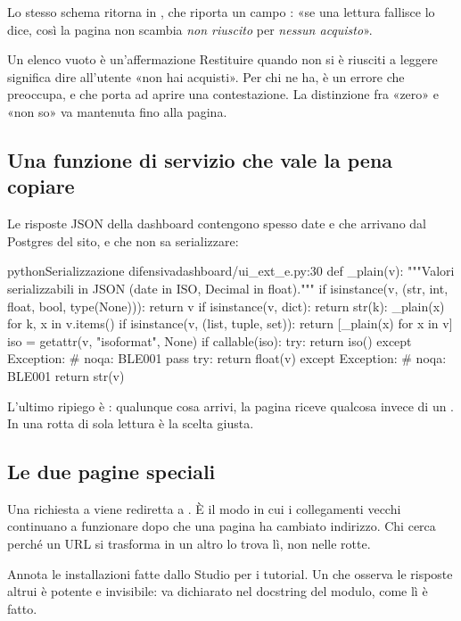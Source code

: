 Lo stesso schema ritorna in , che riporta un campo
: «se una lettura fallisce lo dice, così la pagina non scambia
\emph{non riuscito} per \emph{nessun acquisto}».

\begin{attenzione}{Un elenco vuoto è un'affermazione}
Restituire \cod{[]} quando non si è riusciti a leggere significa dire
all'utente «non hai acquisti». Per chi ne ha, è un errore che preoccupa, e
che porta ad aprire una contestazione. La distinzione fra «zero» e «non so»
va mantenuta fino alla pagina.
\end{attenzione}

\subsection{Una funzione di servizio che vale la pena copiare}

Le risposte JSON della dashboard contengono spesso date e  che
arrivano dal Postgres del sito, e che  non sa serializzare:

\begin{codiceInterno}{python}{Serializzazione difensiva}{dashboard/ui\_ext\_e.py:30}
def _plain(v):
    """Valori serializzabili in JSON (date in ISO, Decimal in float)."""
    if isinstance(v, (str, int, float, bool, type(None))):
        return v
    if isinstance(v, dict):
        return {str(k): _plain(x) for k, x in v.items()}
    if isinstance(v, (list, tuple, set)):
        return [_plain(x) for x in v]
    iso = getattr(v, "isoformat", None)
    if callable(iso):
        try:
            return iso()
        except Exception:  # noqa: BLE001
            pass
    try:
        return float(v)
    except Exception:  # noqa: BLE001
        return str(v)
\end{codiceInterno}

\noindent
L'ultimo ripiego è : qualunque cosa arrivi, la pagina riceve
qualcosa invece di un . In una rotta di sola lettura è la scelta
giusta.

\subsection{Le due pagine speciali}

\begin{description}[leftmargin = 1.6em, style = nextline, itemsep = 5pt]
  \item[\file{ui\_ext\_b.py} fa un redirect in un \cod{before\_request}]
    Una richiesta a  viene rediretta a
    . È il modo in cui i collegamenti vecchi continuano a
    funzionare dopo che una pagina ha cambiato indirizzo. Chi cerca perché un
    URL si trasforma in un altro lo trova lì, non nelle rotte.
  \item[\file{ui\_ext\_a.py} intercetta le installazioni in un \cod{after\_request}]
    Annota le installazioni fatte dallo Studio per i tutorial. Un
     che osserva le risposte altrui è potente e
    invisibile: va dichiarato nel docstring del modulo, come lì è fatto.
\end{description}
